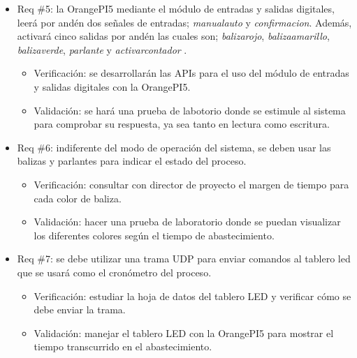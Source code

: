 \documentclass[
11pt, %
]{charter}
\begin{document}
\begin{itemize} 
\item Req \#5: la OrangePI5 mediante el módulo de entradas y salidas digitales, leerá por andén dos señales de entradas; \textit{manualauto} y \textit{confirmacion}.  Además, activará cinco salidas por andén las cuales son; \textit{balizarojo}, \textit{balizaamarillo}, \textit{balizaverde}, \textit{parlante} y \textit{activarcontador} .
\begin{itemize}
		\item Verificación: se desarrollarán las APIs para el uso del módulo de entradas y salidas digitales con la OrangePI5. 
		\item Validación: se hará una prueba de labotorio donde se estimule al sistema para comprobar su respuesta, ya sea tanto en lectura como escritura.  
	\end{itemize}
	
	\end{itemize}

\begin{itemize} 
\item Req \#6: indiferente del modo de operación del sistema, se deben usar las balizas y parlantes para indicar el estado del proceso.
\begin{itemize}
		\item Verificación: consultar con director de proyecto el margen de tiempo para cada color de baliza. 
		\item Validación: hacer una prueba de laboratorio donde se puedan visualizar los diferentes colores según el tiempo de abastecimiento.  
	\end{itemize}
	
	\end{itemize}


\begin{itemize} 
\item Req \#7: se debe utilizar una trama UDP para enviar comandos al tablero led que se usará como el cronómetro del proceso.
\begin{itemize}
		\item Verificación: estudiar la hoja de datos del tablero LED y verificar cómo se debe enviar la trama. 
		\item Validación: manejar el tablero LED con la OrangePI5 para mostrar el tiempo transcurrido en el abastecimiento.  
	\end{itemize}
	
	\end{itemize}
\end{document}
